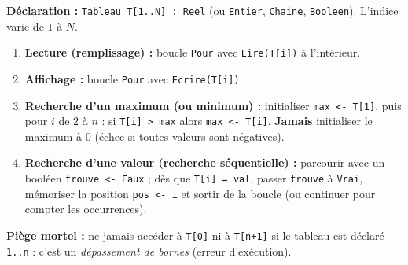 \documentclass[11pt]{article}
\begin{document}
\begin{methode}
\textbf{Déclaration :} \texttt{Tableau T[1..N] : Reel} (ou \texttt{Entier}, \texttt{Chaine}, \texttt{Booleen}). L'indice varie de $1$ à $N$.
\begin{enumerate}
\item \textbf{Lecture (remplissage) :} boucle \texttt{Pour} avec \texttt{Lire(T[i])} à l'intérieur.
\item \textbf{Affichage :} boucle \texttt{Pour} avec \texttt{Ecrire(T[i])}.
\item \textbf{Recherche d'un maximum (ou minimum) :} initialiser \texttt{max <- T[1]}, puis pour $i$ de $2$ à $n$ : si \texttt{T[i] > max} alors \texttt{max <- T[i]}. \textbf{Jamais} initialiser le maximum à $0$ (échec si toutes valeurs sont négatives).
\item \textbf{Recherche d'une valeur (recherche séquentielle) :} parcourir avec un booléen \texttt{trouve <- Faux} ; dès que \texttt{T[i] = val}, passer \texttt{trouve} à \texttt{Vrai}, mémoriser la position \texttt{pos <- i} et sortir de la boucle (ou continuer pour compter les occurrences).
\end{enumerate}
\textbf{Piège mortel :} ne jamais accéder à \texttt{T[0]} ni à \texttt{T[n+1]} si le tableau est déclaré \texttt{1..n} : c'est un \emph{dépassement de bornes} (erreur d'exécution).
\end{methode}
\end{document}
